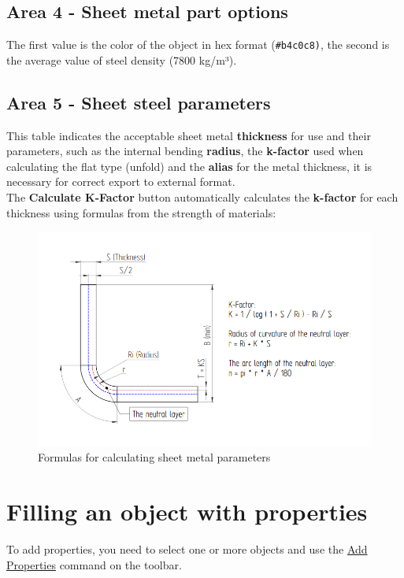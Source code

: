 \documentclass[a4paper,12pt]{article}
\begin{document}
\subsection{Area 4 - Sheet metal part options}
The first value is the color of the object in hex format (\verb|#b4c0c8)|, the second is the average value of steel density (7800 kg/m³).

\pagebreak

\subsection{Area 5 - Sheet steel parameters}
This table indicates the acceptable sheet metal \textbf{thickness} for use and their parameters, such as the internal bending \textbf{radius}, the \textbf{k-factor} used when calculating the flat type (unfold) and the \textbf{alias} for the metal thickness, it is necessary for correct export to external format.\\

The \textbf{Calculate K-Factor} button automatically calculates the \textbf{k-factor} for each thickness using formulas from the strength of materials:

\begin{figure}[htp]
\centering
\includegraphics[width=1.0\textwidth]{img/k_en.png}
\caption{Formulas for calculating sheet metal parameters}
\label{sec:k}
\end{figure}

\pagebreak



\section{Filling an object with properties}
To add properties, you need to select one or more objects and use the \hyperref[sec:5]{Add Properties} command on the toolbar.
\end{document}
